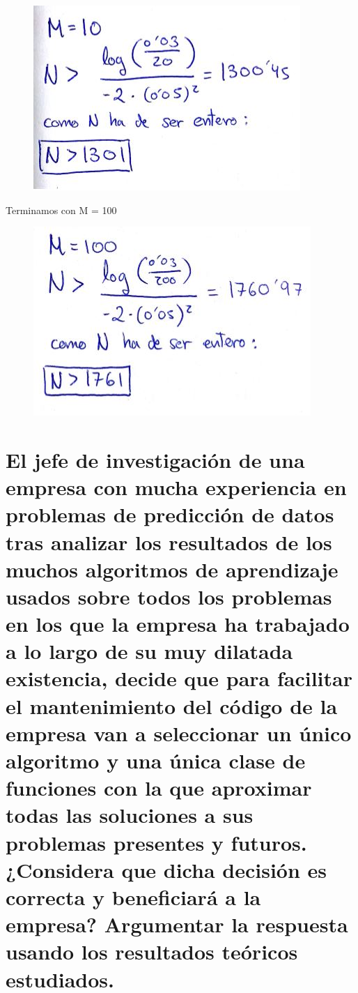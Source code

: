 \begin{figure}[H] %
	\centering
	\includegraphics[scale=0.80]{imagenes/3} 
\end{figure}

Terminamos con M = 100

\begin{figure}[H] %
	\centering
	\includegraphics[scale=0.80]{imagenes/4} 
\end{figure}



\section{El jefe de investigación de una empresa con mucha experiencia en problemas de predicción de datos tras analizar los resultados de los muchos algoritmos de aprendizaje usados sobre todos los problemas en los que la empresa ha trabajado a lo largo de su muy dilatada existencia, decide que para facilitar el mantenimiento del código de la empresa van a seleccionar un único algoritmo y una única clase de funciones con la que aproximar todas las soluciones a sus problemas presentes y futuros. ¿Considera que dicha decisión es correcta y beneficiará a la empresa? Argumentar la respuesta usando los resultados teóricos estudiados.
}

